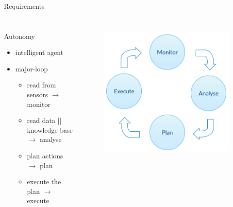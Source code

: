 \begin{frame}{Requirements}
{\begin{columns}
\begin{column}{0.4\textwidth}
\begin{figure}
				\end{figure}
			\end{column}
		\end{columns}
	}
	{
		\begin{columns}
			\begin{column}{0.6\textwidth}
				Autonomy
				\begin{itemize}
					\item{\footnotesize{intelligent agent}}
					\item{\footnotesize{major-loop}}
					\begin{itemize}
						\item{\scriptsize{read from sensors $\rightarrow{}$ monitor}}
						\item{\scriptsize{read data || knowledge base $\rightarrow{}$ analyse}}
						\item{\scriptsize{plan actions $\rightarrow{}$ plan}}
						\item{\scriptsize{execute the plan $\rightarrow{}$ execute}}
					\end{itemize}
				\end{itemize}
			\end{column}
			\begin{column}{0.4\textwidth}
				\begin{figure}
					\centering{}
				\includegraphics[scale=0.2]{images/autonomy.png}

\end{figure}
\end{column}
\end{columns}}
\end{frame}
